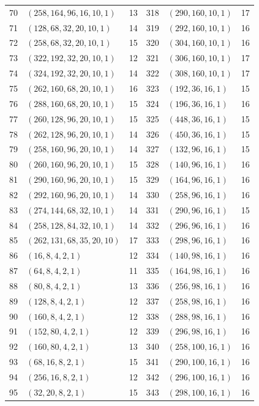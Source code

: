 \begin{longtable}{@{}rlr@{\hspace{12mm}}rlr@{}}
70 & $(258,164,96,16,10,1)$ & 13 & 318 & $(290,160,10,1)$ & 17\\
71 & $(128,68,32,20,10,1)$ & 14 & 319 & $(292,160,10,1)$ & 16\\
72 & $(258,68,32,20,10,1)$ & 15 & 320 & $(304,160,10,1)$ & 16\\
73 & $(322,192,32,20,10,1)$ & 12 & 321 & $(306,160,10,1)$ & 17\\
74 & $(324,192,32,20,10,1)$ & 14 & 322 & $(308,160,10,1)$ & 17\\
75 & $(262,160,68,20,10,1)$ & 16 & 323 & $(192,36,16,1)$ & 15\\
76 & $(288,160,68,20,10,1)$ & 15 & 324 & $(196,36,16,1)$ & 16\\
77 & $(260,128,96,20,10,1)$ & 15 & 325 & $(448,36,16,1)$ & 15\\
78 & $(262,128,96,20,10,1)$ & 14 & 326 & $(450,36,16,1)$ & 15\\
79 & $(258,160,96,20,10,1)$ & 14 & 327 & $(132,96,16,1)$ & 15\\
80 & $(260,160,96,20,10,1)$ & 15 & 328 & $(140,96,16,1)$ & 16\\
81 & $(290,160,96,20,10,1)$ & 15 & 329 & $(164,96,16,1)$ & 16\\
82 & $(292,160,96,20,10,1)$ & 14 & 330 & $(258,96,16,1)$ & 16\\
83 & $(274,144,68,32,10,1)$ & 14 & 331 & $(290,96,16,1)$ & 15\\
84 & $(258,128,84,32,10,1)$ & 14 & 332 & $(296,96,16,1)$ & 16\\
85 & $(262,131,68,35,20,10)$ & 17 & 333 & $(298,96,16,1)$ & 16\\
86 & $(16,8,4,2,1)$ & 12 & 334 & $(140,98,16,1)$ & 16\\
87 & $(64,8,4,2,1)$ & 11 & 335 & $(164,98,16,1)$ & 16\\
88 & $(80,8,4,2,1)$ & 13 & 336 & $(256,98,16,1)$ & 16\\
89 & $(128,8,4,2,1)$ & 12 & 337 & $(258,98,16,1)$ & 16\\
90 & $(160,8,4,2,1)$ & 12 & 338 & $(288,98,16,1)$ & 16\\
91 & $(152,80,4,2,1)$ & 12 & 339 & $(296,98,16,1)$ & 16\\
92 & $(160,80,4,2,1)$ & 13 & 340 & $(258,100,16,1)$ & 16\\
93 & $(68,16,8,2,1)$ & 15 & 341 & $(290,100,16,1)$ & 16\\
94 & $(256,16,8,2,1)$ & 12 & 342 & $(296,100,16,1)$ & 16\\
95 & $(32,20,8,2,1)$ & 15 & 343 & $(298,100,16,1)$ & 16\\

\end{longtable}
